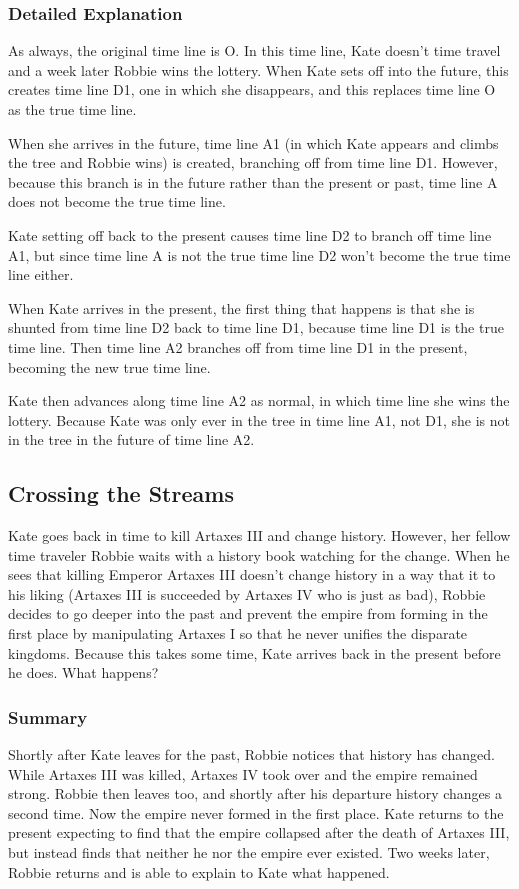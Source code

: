 \begin{multicols*}{2}
\subsubsection{Detailed Explanation}
As always, the original time line is O. In this time line, Kate doesn’t time travel and a week later Robbie wins the lottery. When Kate sets off into the future, this creates time line D1, one in which she disappears, and this replaces time line O as the true time line.

When she arrives in the future, time line A1 (in which Kate appears and climbs the tree and Robbie wins) is created, branching off from time line D1. However, because this branch is in the future rather than the present or past, time line A does not become the true time line.

Kate setting off back to the present causes time line D2 to branch off time line A1, but since time line A is not the true time line D2 won’t become the true time line either.

When Kate arrives in the present, the first thing that happens is that she is shunted from time line D2 back to time line D1, because time line D1 is the true time line. Then time line A2 branches off from time line D1 in the present, becoming the new true time line.

Kate then advances along time line A2 as normal, in which time line she wins the lottery. Because Kate was only ever in the tree in time line A1, not D1, she is not in the tree in the future of time line A2.

\subsection{Crossing the Streams}
Kate goes back in time to kill Artaxes III and change history. However, her fellow time traveler Robbie waits with a history book watching for the change. When he sees that killing Emperor Artaxes III doesn’t change history in a way that it to his liking (Artaxes III is succeeded by Artaxes IV who is just as bad), Robbie decides to go deeper into the past and prevent the empire from forming in the first place by manipulating Artaxes I so that he never unifies the disparate kingdoms. Because this takes some time, Kate arrives back in the present before he does. What happens?

\subsubsection{Summary}
Shortly after Kate leaves for the past, Robbie notices that history has changed. While Artaxes III was killed, Artaxes IV took over and the empire remained strong. Robbie then leaves too, and shortly after his departure history changes a second time. Now the empire never formed in the first place. Kate returns to the present expecting to find that the empire collapsed after the death of Artaxes III, but instead finds that neither he nor the empire ever existed. Two weeks later, Robbie returns and is able to explain to Kate what happened.


\end{multicols*}
